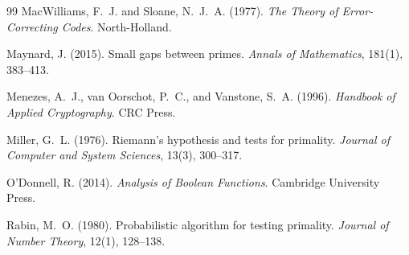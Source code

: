 \documentclass[12pt]{article}
\begin{document}
\begin{thebibliography}{99}
MacWilliams, F.~J. and Sloane, N.~J.~A. (1977).
\emph{The Theory of Error-Correcting Codes}.
North-Holland.

Maynard, J. (2015).
Small gaps between primes.
\emph{Annals of Mathematics}, 181(1), 383--413.

Menezes, A.~J., van Oorschot, P.~C., and Vanstone, S.~A. (1996).
\emph{Handbook of Applied Cryptography}.
CRC Press.

Miller, G.~L. (1976).
Riemann's hypothesis and tests for primality.
\emph{Journal of Computer and System Sciences}, 13(3), 300--317.

O'Donnell, R. (2014).
\emph{Analysis of Boolean Functions}.
Cambridge University Press.

Rabin, M.~O. (1980).
Probabilistic algorithm for testing primality.
\emph{Journal of Number Theory}, 12(1), 128--138.

\end{thebibliography}

\end{document}
